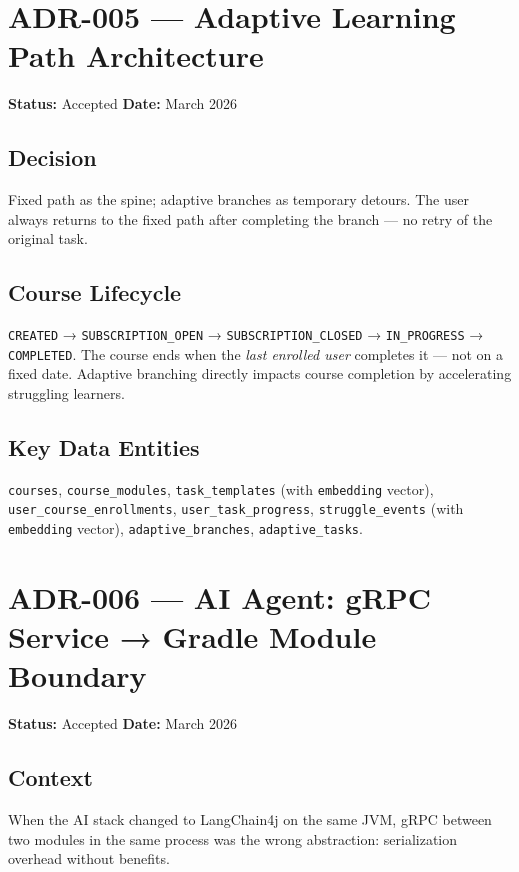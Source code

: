 \section{ADR-005 — Adaptive Learning Path Architecture}
\label{adr:005}
\textbf{Status:} Accepted \quad \textbf{Date:} March 2026

\subsection*{Decision}
Fixed path as the spine; adaptive branches as temporary detours. The user always returns to the fixed path after completing the branch — no retry of the original task.

\subsection*{Course Lifecycle}
\texttt{CREATED} → \texttt{SUBSCRIPTION\_OPEN} → \texttt{SUBSCRIPTION\_CLOSED} → \texttt{IN\_PROGRESS} → \texttt{COMPLETED}. The course ends when the \emph{last enrolled user} completes it — not on a fixed date. Adaptive branching directly impacts course completion by accelerating struggling learners.

\subsection*{Key Data Entities}
\texttt{courses}, \texttt{course\_modules}, \texttt{task\_templates} (with \texttt{embedding} vector), \texttt{user\_course\_enrollments}, \texttt{user\_task\_progress}, \texttt{struggle\_events} (with \texttt{embedding} vector), \texttt{adaptive\_branches}, \texttt{adaptive\_tasks}.

\section{ADR-006 — AI Agent: gRPC Service → Gradle Module Boundary}
\label{adr:006}
\textbf{Status:} Accepted \quad \textbf{Date:} March 2026

\subsection*{Context}
When the AI stack changed to LangChain4j on the same JVM, gRPC between two modules in the same process was the wrong abstraction: serialization overhead without benefits.

